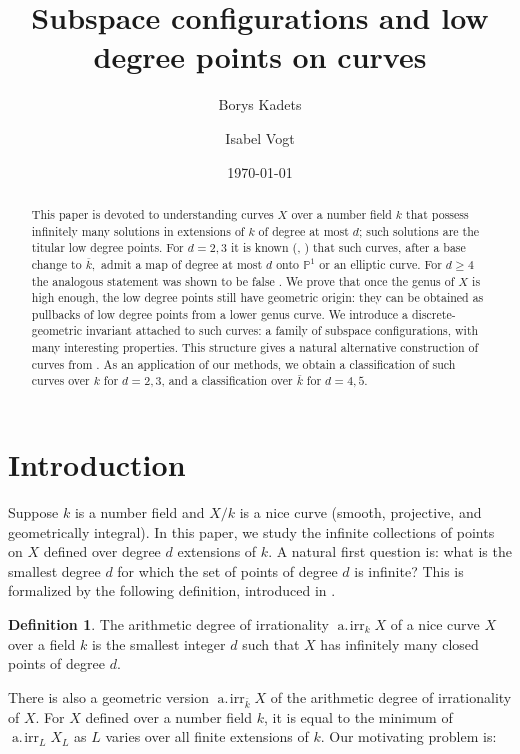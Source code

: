 \documentclass[11pt]{amsart}
\title{Subspace configurations and low degree points on curves}
\author{Borys Kadets}
\author{Isabel Vogt}
\date{\today}
\newcommand{\defi}[1]{\textsf{#1}}
\newcommand{\PP}{\mathbb{P}}
\newcommand{\kbar}{{\bar{k}}}
\newcommand{\airr}{\operatorname{a.\!irr}}
\theoremstyle{definition}
\newtheorem{definition}[theorem]{Definition}
\theoremstyle{remark}
\begin{document}
\begin{abstract}
    This paper is devoted to understanding curves $X$ over a number field $k$ that possess infinitely many solutions in extensions of $k$ of degree at most $d$; such solutions are the titular low degree points. For $d=2,3$ it is known (\cite{Harris-Silverman1991}, \cite{Abramovich-Harris1991}) that such curves, after a base change to $\overline{k},$ admit a map of degree at most $d$ onto $\PP^1$ or an elliptic curve. For $d \geqslant 4$ the analogous statement was shown to be false \cite{Debarre-Fahlaoui1993}. We prove that once the genus of $X$ is high enough, the low degree points still have geometric origin: they can be obtained as pullbacks of low degree points from a lower genus curve. We introduce a discrete-geometric invariant attached to such curves: a family of subspace configurations, with many interesting properties. This structure gives a natural alternative construction of curves from \cite{Debarre-Fahlaoui1993}. As an application of our methods, we obtain a classification of such curves over $k$ for $d=2,3$, and a classification over $\kbar$ for $d=4,5$.
\end{abstract}
\maketitle

\section{Introduction}


Suppose $k$ is a number field and $X/k$ is a \defi{nice} curve (smooth, projective, and geometrically integral).  In this paper, we study the infinite collections of points on $X$ defined over degree $d$ extensions of $k$.
A natural first question is: what is the smallest degree \(d\) for which the set of points of degree \(d\) is infinite? This is formalized by the following definition, introduced in \cite{Smith-Vogt2020}.

\begin{definition}
The \defi{arithmetic degree of irrationality} $\airr_kX$ of a nice curve $X$ over a field $k$ is the smallest integer $d$ such that $X$ has infinitely many closed points of degree $d$.
\end{definition}

There is also a geometric version \(\airr_{\bar{k}}X\) of the arithmetic degree of irrationality of \(X\).  For \(X\) defined over a number field \(k\), it is equal to the minimum of \(\airr_L X_L\) as \(L\) varies over all finite extensions of \(k\).
Our motivating problem is:
\end{document}
